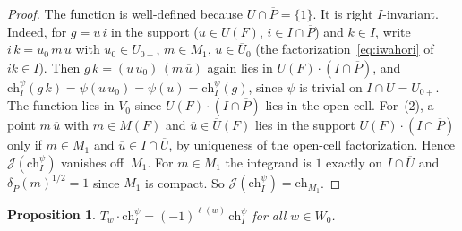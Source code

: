 \documentclass[11pt]{amsart}
\newtheorem{proposition}[theorem]{Proposition}
\theoremstyle{definition}
\theoremstyle{remark}
\newcommand{\barr}[1]{\overline{#1}}
\begin{document}
\begin{proof}
The function is well-defined because $U \cap \barr{P} = \{1\}$. It is right $I$-invariant. Indeed, for $g = u\,i$ in the support ($u\in U(F)$, $i\in I\cap\barr{P}$) and $k\in I$, write $i\,k = u_0\,m\,\barr{u}$ with $u_0 \in U_{0+}$, $m \in M_1$, $\barr{u} \in \barr{U}_0$ (the factorization~\eqref{eq:iwahori} of $ik\in I$). Then $g\,k = (u\,u_0)\,(m\,\barr{u})$ again lies in $U(F)\cdot(I\cap\barr{P})$, and $\mathrm{ch}_I^\psi(g\,k) = \psi(u\,u_0) = \psi(u) = \mathrm{ch}_I^\psi(g)$, since $\psi$ is trivial on $I\cap U = U_{0+}$. The function lies in $V_0$ since $U(F)\cdot(I\cap\barr{P})$ lies in the open cell. For~(2), a point $m\,\barr{u}$ with $m \in M(F)$ and $\barr{u} \in \barr{U}(F)$ lies in the support $U(F)\cdot(I\cap\barr{P})$ only if $m \in M_1$ and $\barr{u} \in I\cap\barr{U}$, by uniqueness of the open-cell factorization. Hence $\mathcal{J}(\mathrm{ch}_I^\psi)$ vanishes off~$M_1$. For $m \in M_1$ the integrand is $1$ exactly on $I\cap\barr{U}$ and $\delta_{\barr{P}}(m)^{1/2} = 1$ since $M_1$ is compact. So $\mathcal{J}(\mathrm{ch}_I^\psi) = \mathrm{ch}_{M_1}$.
\end{proof}

\begin{proposition}\label{prop:ranksum}
$T_w \cdot \mathrm{ch}_I^\psi = (-1)^{\ell(w)}\,\mathrm{ch}_I^\psi$ for all $w \in W_0$.
\end{proposition}
\end{document}
